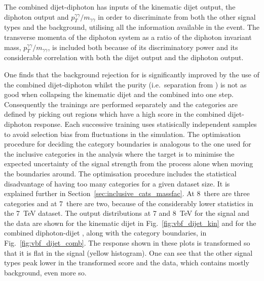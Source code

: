The combined dijet-diphoton \BDT has inputs of the kinematic dijet \BDT output, the diphoton \BDT output and $p_{T}^{\gamma\gamma}/m_{\gamma\gamma}$ in order to discriminate \VBF from both the other signal types and the background, utilising all the information available in the event. The transverse momenta of the diphoton system as a ratio of the diphoton invariant mass, $p_{T}^{\gamma\gamma}/m_{\gamma\gamma}$, is included both because of its discriminatory power and its considerable correlation with both the dijet \BDT output and the diphoton \BDT output.

One finds that the background rejection for \VBF is significantly improved by the use of the combined dijet-diphoton \BDT whilst the \VBF purity (i.e.~separation from \ggH) is not as good when collapsing the kinematic dijet \BDT and the combined \BDT into one step. Consequently the trainings are performed separately and the \VBF categories are defined by picking out regions which have a high score in the combined dijet-diphoton \BDT response. Each successive \BDT training uses statisically independent \MC samples to avoid selection bias from fluctuations in the simulation. The optimisation procedure for deciding the category boundaries is analogous to the one used for the inclusive categories in the \MFM analysis where the target is to minimise the expected uncertainty of the signal strength from the \VBF process alone when moving the boundaries around. The optimisation procedure includes the statistical disadvantage of having too many categories for a given dataset size. It is explained further in Section~\ref{sec:inclusive_cats_massfac}. At 8~\TeV there are three \VBF categories and at 7~\TeV there are two, because of the considerably lower statistics in the 7~TeV dataset. The output distributions at 7 and 8~TeV for the signal and the data are shown for the kinematic dijet \BDT in Fig.~\ref{fig:vbf_dijet_kin} and for the combined diphoton-dijet \BDT, along with the \VBF category boundaries, in Fig.~\ref{fig:vbf_dijet_comb}. The \BDT response shown in these plots is transformed so that it is flat in the \VBF signal (yellow histogram). One can see that the other signal types peak lower in the transformed score and the data, which contains mostly background, even more so. 

